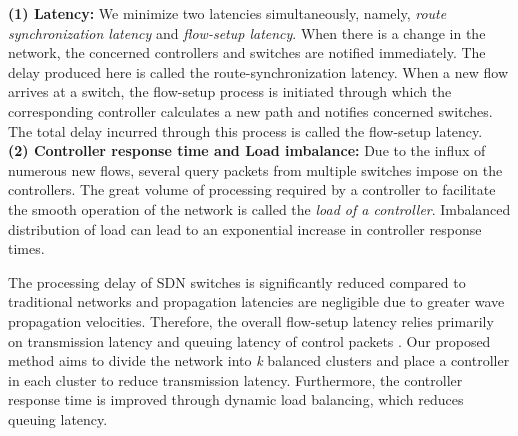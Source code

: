 \documentclass[final,5p,times]{cas-dc}
\begin{document}
	\begin{adjustwidth}{0.5cm}{}
		\textbf{(1) Latency:} We minimize two latencies simultaneously, namely, \textit{route synchronization latency} and \textit{flow-setup latency}. When there is a change in the network, the concerned controllers and switches are notified immediately. The delay produced here is called the route-synchronization latency. When a new flow arrives at a switch, the flow-setup process is initiated through which the corresponding controller calculates a new path and notifies concerned switches. The total delay incurred through this process is called the flow-setup latency. \\
		\textbf{(2) Controller response time and Load imbalance:} Due to the influx of numerous new flows, several query packets from multiple switches impose on the controllers. The great volume of processing required by a controller to facilitate the smooth operation of the network is called the \textit{load of a controller}. Imbalanced distribution of load can lead to an exponential increase in controller response times.
	\end{adjustwidth}
	The processing delay of SDN switches is significantly reduced compared to traditional networks and propagation latencies are negligible due to greater wave propagation velocities. Therefore, the overall flow-setup latency relies primarily on transmission latency and queuing latency of control packets \cite{forouzan2006data}. Our proposed method aims to divide the network into \textit{k} balanced clusters and place a controller in each cluster to reduce transmission latency. Furthermore, the controller response time is improved through dynamic load balancing, which reduces queuing latency. 
	
\end{document}
